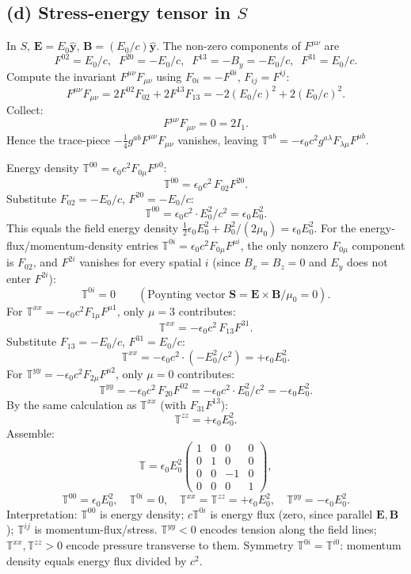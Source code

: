 \documentclass[11pt]{article}
\begin{document}
\subsection*{(d) Stress-energy tensor in $S$}

In $S$, $\bm E = E_0\hat{\bm y}$, $\bm B = (E_0/c)\hat{\bm y}$. The non-zero components of $F^{\mu\nu}$ are
\[ F^{02} = E_0/c,\;\; F^{20} = -E_0/c,\;\; F^{13} = -B_y = -E_0/c,\;\; F^{31} = E_0/c. \]
Compute the invariant $F^{\mu\nu}F_{\mu\nu}$ using $F_{0i}=-F^{0i}$, $F_{ij}=F^{ij}$:
\[ F^{\mu\nu}F_{\mu\nu} = 2F^{02}F_{02} + 2F^{13}F_{13} = -2(E_0/c)^2 + 2(E_0/c)^2. \]
Collect:
\[ F^{\mu\nu}F_{\mu\nu} = 0 = 2I_1. \]
Hence the trace-piece $-\tfrac14 g^{ab}F^{\mu\nu}F_{\mu\nu}$ vanishes, leaving $\mathbb{T}^{ab} = -\epsilon_0 c^2 g^{a\lambda}F_{\lambda\mu}F^{\mu b}$.

Energy density $\mathbb{T}^{00} = \epsilon_0 c^2 F_{0\mu}F^{\mu 0}$:
\[ \mathbb{T}^{00} = \epsilon_0 c^2\,F_{02}F^{20}. \]
Substitute $F_{02} = -E_0/c$, $F^{20} = -E_0/c$:
\[ \mathbb{T}^{00} = \epsilon_0 c^2\cdot E_0^2/c^2 = \epsilon_0 E_0^2. \]
This equals the field energy density $\tfrac12\epsilon_0 E_0^2 + B_0^2/(2\mu_0) = \epsilon_0 E_0^2$. For the energy-flux/momentum-density entries $\mathbb{T}^{0i} = \epsilon_0 c^2 F_{0\mu}F^{\mu i}$, the only nonzero $F_{0\mu}$ component is $F_{02}$, and $F^{2i}$ vanishes for every spatial $i$ (since $B_x=B_z=0$ and $E_y$ does not enter $F^{2i}$):
\[ \mathbb{T}^{0i} = 0\qquad(\text{Poynting vector }\bm S=\bm E\times\bm B/\mu_0 = 0). \]
For $\mathbb{T}^{xx} = -\epsilon_0 c^2 F_{1\mu}F^{\mu 1}$, only $\mu=3$ contributes:
\[ \mathbb{T}^{xx} = -\epsilon_0 c^2\,F_{13}F^{31}. \]
Substitute $F_{13} = -E_0/c$, $F^{31} = E_0/c$:
\[ \mathbb{T}^{xx} = -\epsilon_0 c^2\cdot(-E_0^2/c^2) = +\epsilon_0 E_0^2. \]
For $\mathbb{T}^{yy} = -\epsilon_0 c^2 F_{2\mu}F^{\mu 2}$, only $\mu=0$ contributes:
\[ \mathbb{T}^{yy} = -\epsilon_0 c^2\,F_{20}F^{02} = -\epsilon_0 c^2\cdot E_0^2/c^2 = -\epsilon_0 E_0^2. \]
By the same calculation as $\mathbb{T}^{xx}$ (with $F_{31}F^{13}$):
\[ \mathbb{T}^{zz} = +\epsilon_0 E_0^2. \]
Assemble:
\begin{equation}
\mathbb{T} = \epsilon_0 E_0^2\begin{pmatrix} 1 & 0 & 0 & 0 \\ 0 & 1 & 0 & 0 \\ 0 & 0 & -1 & 0 \\ 0 & 0 & 0 & 1\end{pmatrix},
\end{equation}
\begin{equation}
\boxed{\mathbb{T}^{00}=\epsilon_0 E_0^2,\quad \mathbb{T}^{0i}=0,\quad \mathbb{T}^{xx}=\mathbb{T}^{zz}=+\epsilon_0 E_0^2,\quad \mathbb{T}^{yy}=-\epsilon_0 E_0^2.}
\end{equation}
Interpretation: $\mathbb{T}^{00}$ is energy density; $c\mathbb{T}^{0i}$ is energy flux (zero, since parallel $\bm E,\bm B$); $\mathbb{T}^{ij}$ is momentum-flux/stress. $\mathbb{T}^{yy}<0$ encodes tension along the field lines; $\mathbb{T}^{xx},\mathbb{T}^{zz}>0$ encode pressure transverse to them. Symmetry $\mathbb{T}^{0i}=\mathbb{T}^{i0}$: momentum density equals energy flux divided by $c^2$.
\end{document}

